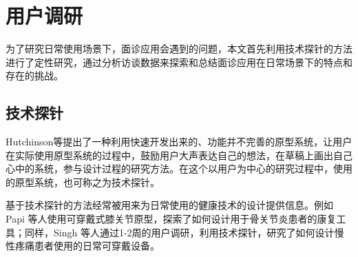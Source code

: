 \chapter{用户调研}

为了研究日常使用场景下，面诊应用会遇到的问题，本文首先利用技术探针\cite{Hutchinson2003Technology}的方法进行了定性研究，通过分析访谈数据来探索和总结面诊应用在日常场景下的特点和存在的挑战。


\section{技术探针}

Hutchinson等\cite{Hutchinson2003Technology}提出了一种利用快速开发出来的、功能并不完善的原型系统，让用户在实际使用原型系统的过程中，鼓励用户大声表达自己的想法，在草稿上画出自己心中的系统，参与设计过程的研究方法。在这个以用户为中心的研究过程中，使用的原型系统，也可称之为技术探针。

基于技术探针的方法经常被用来为日常使用的健康技术的设计提供信息。例如 Papi\cite{papi2015knee} 等人使用可穿戴式膝关节原型，探索了如何设计用于骨关节炎患者的康复工具；同样，Singh \cite{singh2017supporting} 等人通过1-2周的用户调研，利用技术探针，研究了如何设计慢性疼痛患者使用的日常可穿戴设备。

